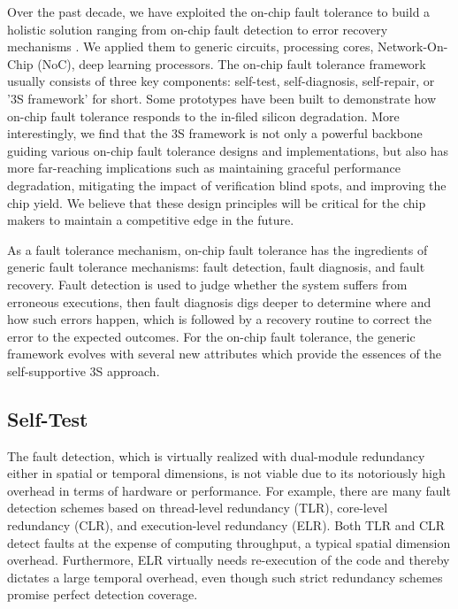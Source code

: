 Over the past decade, we have exploited the on-chip fault tolerance to build a holistic solution ranging from on-chip fault detection to error recovery mechanisms \cite{yan2011revivenet, fu2011abacus,  yan2015corerank, yan2010svfd, zhang2009topology, han2013revivepath, liu2021hyca}. We applied them to generic circuits, processing cores, Network-On-Chip
(NoC), deep learning processors. The on-chip fault tolerance framework usually consists of three key components: self-test, self-diagnosis, self-repair, or '3S framework' for short. Some prototypes have been built to demonstrate how on-chip fault tolerance responds to the in-filed silicon degradation. More interestingly, we find that the 3S framework is not only a powerful backbone guiding various on-chip fault tolerance designs and implementations, but also has more far-reaching implications such as maintaining graceful performance degradation, mitigating the impact of verification blind spots, and improving the chip yield. We believe that these design principles will be critical for the chip makers to maintain a competitive edge in the future.

As a fault tolerance mechanism, on-chip fault tolerance has the ingredients of generic fault tolerance mechanisms: fault detection, fault diagnosis, and fault recovery. Fault detection is used to judge whether the system suffers from erroneous executions, then fault diagnosis digs deeper to determine where and how such errors happen, which is followed by a recovery routine to correct the error to the expected outcomes. For the on-chip fault tolerance, the generic framework evolves with several new attributes which provide the essences of the self-supportive 3S approach.

\subsection{Self-Test}
The fault detection, which is virtually realized with dual-module redundancy either in spatial or temporal dimensions, is not viable due to its notoriously high overhead in terms of hardware or performance. For example, there are many fault detection schemes based on thread-level redundancy (TLR), core-level redundancy (CLR), and execution-level redundancy (ELR). Both TLR and CLR detect faults at the expense of computing throughput, a typical spatial dimension overhead. Furthermore, ELR virtually needs re-execution of the code and thereby dictates a large temporal overhead, even though such strict redundancy schemes promise perfect detection coverage.

